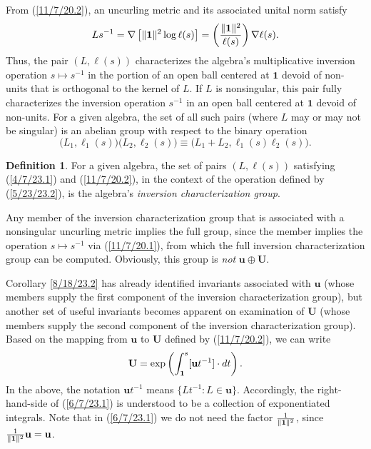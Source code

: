 \documentclass{amsart}
\numberwithin{equation}{section}
\theoremstyle{definition}
\newtheorem{definition}[theorem]{Definition}
\numberwithin{theorem}{section}
\begin{document}
  
    From (\ref{11/7/20.2}), an uncurling metric and its associated unital norm satisfy  \begin{equation}\label{11/7/20.1} Ls^{-1}  = \nabla\left[\|{\bf 1}\|^2\log  \ell(s)\right] =   \left(\frac{\|{\bf 1}\|^2}{ \ell(s)}\right)\nabla \ell(s).\end{equation} 
Thus, the pair $(L, \ell(s))$ characterizes the algebra's multiplicative inversion operation $s\mapsto s^{-1}$ in the portion of an open ball centered at $\mathbf{1}$ devoid of non-units that is orthogonal to the kernel of $L$.  If $L$ is nonsingular, this pair fully characterizes the inversion operation $s^{-1}$ in an open ball centered at $\mathbf{1}$ devoid of non-units.  For a given algebra, the set of all such pairs (where $L$ may or may not be singular) is an abelian group with respect to the binary operation 
\begin{equation}\label{5/23/23.2} \big(L_1, \ell_1(s)\big)\big(L_2, \ell_2(s)\big) \equiv 
\big(L_1+L_2, \ell_1(s)  \ell_2(s)\big).\end{equation} 
\begin{definition} For a given algebra, the set of pairs $(L, \ell(s))$ satisfying (\ref{4/7/23.1}) and (\ref{11/7/20.2}), in the context of the operation defined by (\ref{5/23/23.2}), is the algebra's {\it inversion characterization group}. \end{definition}

Any member of the inversion characterization group that is associated with a nonsingular uncurling metric implies the full group, since the member implies the operation $s\mapsto s^{-1}$ via (\ref{11/7/20.1}), from which the full inversion characterization group can be computed.  Obviously, this group is {\it not} $\mathbf{u}\oplus\mathbf{U}$. 

Corollary \ref{8/18/23.2} has already identified invariants associated with $\mathbf{u}$ (whose members supply the first component of the inversion characterization group), but another set of useful invariants becomes apparent on examination of $\mathbf{U}$ (whose members supply the second component of the inversion characterization group).  Based on the mapping from $\mathbf{u}$ to $\mathbf{U}$ defined by (\ref{11/7/20.2}),  we can write \begin{equation}  \mathbf{U} = \exp\left(\int_{\bf 1}^s [\mathbf{u}t^{-1}]\cdot dt\right). \label{6/7/23.1}\end{equation}  In the above, the notation $\mathbf{u}t^{-1}$ means $\{Lt^{-1}: L\in \mathbf{u}\}$.  Accordingly, the right-hand-side of (\ref{6/7/23.1}) is understood to be a collection of exponentiated integrals.   Note that in (\ref{6/7/23.1}) we do not need the factor $\frac{1}{\|{\bf 1}\|^2}$, since $\frac{1}{\|{\bf 1}\|^2}\mathbf{u}=\mathbf{u}$.  
\end{document}
